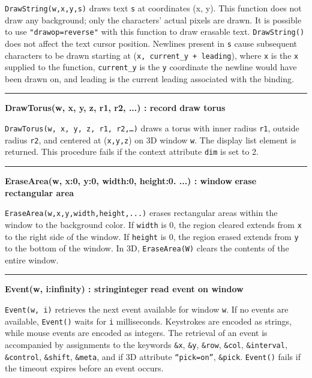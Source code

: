\noindent
\texttt{DrawString(w,x,y,s)} draws text \texttt{s} at coordinates (x,
y). This function does not draw any background; only the
characters' actual pixels are drawn. It is possible to
use \texttt{"drawop=reverse"} with this
function to draw erasable text. \texttt{DrawString()} does not affect
the text cursor position. Newlines present in \texttt{s} cause
subsequent characters to be drawn starting at
(\texttt{x, current\_y + leading}), where \texttt{x} is the
\texttt{x} supplied to the function,
\texttt{current\_y} is the \texttt{y} coordinate the newline would have
been drawn on, and leading is the current leading associated with the
binding.

\bigskip\hrule\vspace{0.1cm}
\noindent
{\bf DrawTorus(w, x, y, z, r1, r2, ...) : record } \hfill {\bf draw torus}

\noindent
\texttt{DrawTorus(w, x, y, z, r1, r2,{\dots})} draws a torus with
inner radius \texttt{r1}, outside radius \texttt{r2}, and centered at
(\texttt{x,y,z}) on 3D window \texttt{w}. The display list element is
returned. This procedure fails if the context attribute \texttt{dim} is
set to 2.

\bigskip\hrule\vspace{0.1cm}
\noindent
{\bf EraseArea(w, x:0, y:0, width:0, height:0. ...) : window } \hfill {\bf erase rectangular area}

\noindent
\texttt{EraseArea(w,x,y,width,height,...)} erases rectangular areas
within the window to the background color. If \texttt{width} is 0,
the region cleared extends from \texttt{x} to the right side of the
window. If \texttt{height} is 0, the region erased extends from
\texttt{y} to the bottom of the window. In 3D, \texttt{EraseArea(W)}
clears the contents of the entire window.

\bigskip\hrule\vspace{0.1cm}
\noindent
{\bf Event(w, i:infinity) : string{\textbar}integer } \hfill {\bf  read event on window}

\noindent
\texttt{Event(w, i)} retrieves the next event available for window
\texttt{w}. If no events are available, \texttt{Event()} waits for
\texttt{i} milliseconds. Keystrokes are encoded as strings, while mouse
events are encoded as integers. The retrieval of an event is
accompanied by assignments to the keywords \texttt{\&x}, \texttt{\&y},
\texttt{\&row}, \texttt{\&col}, \texttt{\&interval},
\texttt{\&control}, \texttt{\&shift}, \texttt{\&meta}, and if 3D
attribute \texttt{{\textquotedblleft}pick=on{\textquotedblright}},
\texttt{\&pick}. \texttt{Event()} fails if the timeout expires before
an event occurs.


